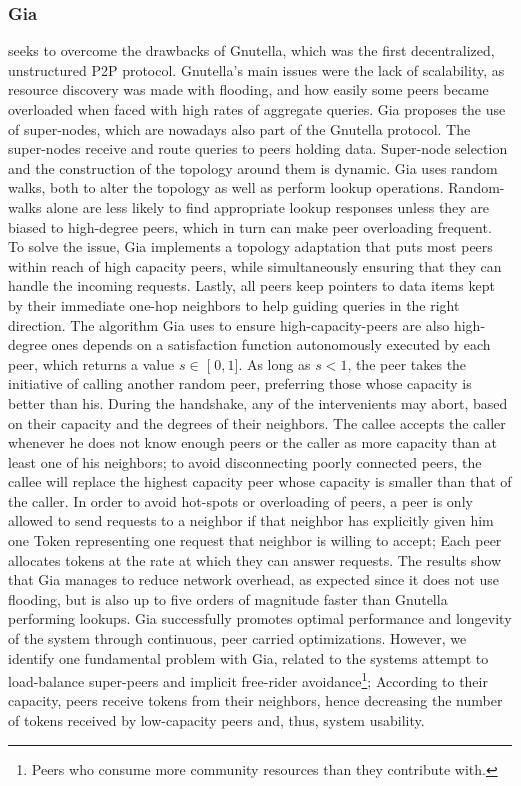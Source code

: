 \documentclass[runningheads]{llncs}
\begin{document}
\subsubsection{Gia}\cite{gia} seeks to overcome the drawbacks of Gnutella\cite{gnutella-rfc}, which was the first decentralized, unstructured P2P protocol. Gnutella's main issues were the lack of scalability, as resource discovery was made with flooding, and how easily some peers became overloaded when faced with high rates of aggregate queries. Gia proposes the use of super-nodes, which are nowadays also part of the Gnutella protocol. The super-nodes receive and route queries to peers holding data. Super-node selection and the construction of the topology around them is dynamic. Gia uses random walks, both to alter the topology as well as perform lookup operations. Random-walks alone are less likely to find appropriate lookup responses unless they are biased to high-degree peers, which in turn can make peer overloading frequent. To solve the issue, Gia implements a topology adaptation that puts most peers within reach of high capacity peers, while simultaneously ensuring that they can handle the incoming requests. Lastly, all peers keep pointers to data items kept by their immediate one-hop neighbors to help guiding queries in the right direction. The algorithm Gia uses to ensure high-capacity-peers are also high-degree ones depends on a satisfaction function autonomously executed by each peer, which returns a value $s\in\mathclose[0,1\mathclose]$. As long as $s<1$, the peer takes the initiative of calling another random peer, preferring those whose capacity is better than his. During the handshake, any of the intervenients may abort, based on their capacity and the degrees of their neighbors. The callee accepts the caller whenever he does not know enough peers or the caller as more capacity than at least one of his neighbors; to avoid disconnecting poorly connected peers, the callee will replace the highest capacity peer whose capacity is smaller than that of the caller. In order to avoid hot-spots or overloading of peers, a peer is only allowed to send requests to a neighbor if that neighbor has explicitly given him one Token representing one request that neighbor is willing to accept; Each peer allocates tokens at the rate at which they can answer requests. The results show that Gia manages to reduce network overhead, as expected since it does not use flooding, but is also up to five orders of magnitude faster than Gnutella performing lookups. Gia successfully promotes optimal performance and longevity of the system through continuous, peer carried optimizations. However, we identify one fundamental problem with Gia, related to the systems attempt to load-balance super-peers and implicit free-rider avoidance\footnote{Peers who consume more community resources than they contribute with.}; According to their capacity, peers receive tokens from their neighbors, hence decreasing the number of tokens received by low-capacity peers and, thus, system usability.
\end{document}
